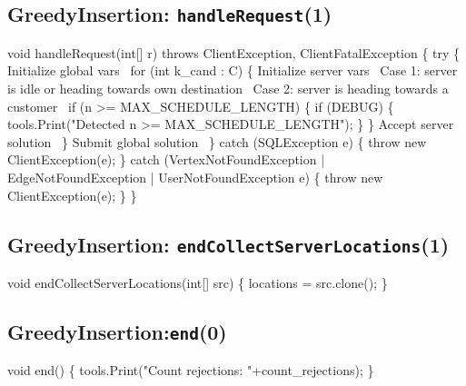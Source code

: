 \subsection{GreedyInsertion: \texttt{handleRequest}(1)}
\nwenddocs{}\endmoddef\nwstartdeflinemarkup{}\nwenddeflinemarkup
void handleRequest(int[] r) throws ClientException, ClientFatalException \{
  try \{
    \LA{}Initialize global vars~{\nwtagstyle{}}\RA{}
    for (int k_cand : C) \{
      \LA{}Initialize server vars~{\nwtagstyle{}}\RA{}
      \LA{}Case 1: server is idle or heading towards own destination~{\nwtagstyle{}}\RA{}
      \LA{}Case 2: server is heading towards a customer~{\nwtagstyle{}}\RA{}
      if (n >= MAX_SCHEDULE_LENGTH) \{
        if (DEBUG) \{
          tools.Print("Detected n >= MAX_SCHEDULE_LENGTH");
        \}
      \}
      \LA{}Accept server solution~{\nwtagstyle{}}\RA{}
    \}
    \LA{}Submit global solution~{\nwtagstyle{}}\RA{}
  \} catch (SQLException e) \{
    throw new ClientException(e);
  \} catch (VertexNotFoundException | EdgeNotFoundException | UserNotFoundException e) \{
    throw new ClientException(e);
  \}
\}
\nwendcode{}\nwdocspar

\subsection{GreedyInsertion: \texttt{endCollectServerLocations}(1)}
\nwenddocs{}\endmoddef\nwstartdeflinemarkup{}\nwenddeflinemarkup
void endCollectServerLocations(int[] src) \{
  locations = src.clone();
\}
\nwendcode{}\nwdocspar

\subsection{GreedyInsertion:\texttt{end}(0)}
\nwenddocs{}\endmoddef\nwstartdeflinemarkup{}\nwenddeflinemarkup
void end() \{
  tools.Print("Count rejections: "+count_rejections);
\}
\nwendcode{}\nwdocspar

